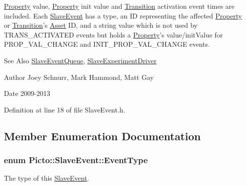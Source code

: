 \hyperlink{class_picto_1_1_property}{Property} value, \hyperlink{class_picto_1_1_property}{Property} init value and \hyperlink{class_picto_1_1_transition}{Transition} activation event times are included. Each \hyperlink{class_picto_1_1_slave_event}{Slave\-Event} has a type, an I\-D representing the affected \hyperlink{class_picto_1_1_property}{Property} or \hyperlink{class_picto_1_1_transition}{Transition}'s \hyperlink{class_picto_1_1_asset}{Asset} I\-D, and a string value which is not used by T\-R\-A\-N\-S\-\_\-\-A\-C\-T\-I\-V\-A\-T\-E\-D events but holds a \hyperlink{class_picto_1_1_property}{Property}'s value/init\-Value for P\-R\-O\-P\-\_\-\-V\-A\-L\-\_\-\-C\-H\-A\-N\-G\-E and I\-N\-I\-T\-\_\-\-P\-R\-O\-P\-\_\-\-V\-A\-L\-\_\-\-C\-H\-A\-N\-G\-E events. \begin{DoxySeeAlso}{See Also}
\hyperlink{class_picto_1_1_slave_event_queue}{Slave\-Event\-Queue}, \hyperlink{class_picto_1_1_slave_experiment_driver}{Slave\-Experiment\-Driver} 
\end{DoxySeeAlso}
\begin{DoxyAuthor}{Author}
Joey Schnurr, Mark Hammond, Matt Gay 
\end{DoxyAuthor}
\begin{DoxyDate}{Date}
2009-\/2013 
\end{DoxyDate}


Definition at line 18 of file Slave\-Event.\-h.



\subsection{Member Enumeration Documentation}
\hypertarget{class_picto_1_1_slave_event_a5e2557edef42f1cfd7ae98463166c4a4}{
\subsubsection[{Event\-Type}]{\setlength{\rightskip}{0pt plus 5cm}enum {\bf Picto\-::\-Slave\-Event\-::\-Event\-Type}}}\label{class_picto_1_1_slave_event_a5e2557edef42f1cfd7ae98463166c4a4}


The type of this \hyperlink{class_picto_1_1_slave_event}{Slave\-Event}. 


